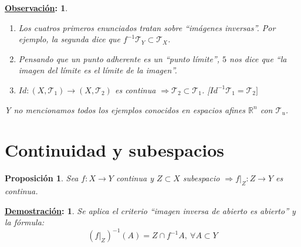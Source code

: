 \documentclass[10pt,a4paper,openright]{book}
\theoremstyle{break}
\newtheorem*{prop}{Proposición}
\newtheorem*{demo}{\underline{Demostración}:}
\newtheorem*{obs}{\underline{Observación}:}
\begin{document}
\begin{obs}
\begin{enumerate}
    \item Los cuatros primeros enunciados tratan sobre ``imágenes inversas''. Por ejemplo, la segunda dice que $f^{-1}\mathcal{T}_Y \subset \mathcal{T}_X$.
    \item Pensando que un punto adherente es un ``punto límite'', $5$ nos dice que ``la imagen del límite es el límite de la imagen''.
    \item $Id: \left( X, \mathcal{T}_1 \right) \rightarrow \left( X, \mathcal{T}_2 \right)$ es continua $\Rightarrow \mathcal{T}_2 \subset \mathcal{T}_1$. [$Id^{-1}\mathcal{T}_1 = \mathcal{T}_2]$
\end{enumerate}
Y no mencionamos todos los ejemplos conocidos en espacios afines $\mathbb{R}^n$ con $\mathcal{T}_u$.
\end{obs}

\section{Continuidad y subespacios}%
\label{sec:continuidad_y_subespacios}
\begin{prop}
Sea $f: X \rightarrow Y$ continua y $Z \subset X$ subespacio $\Rightarrow f|_Z : Z \rightarrow Y$ es continua.
\end{prop}
\begin{demo}
Se aplica el criterio ``imagen inversa de abierto es abierto'' y la fórmula:
\[
\left( f|_Z \right)^{-1} \left( A \right) = Z \cap f^{-1}A,\ \forall A \subset Y
\]
\end{demo}
\end{document}
